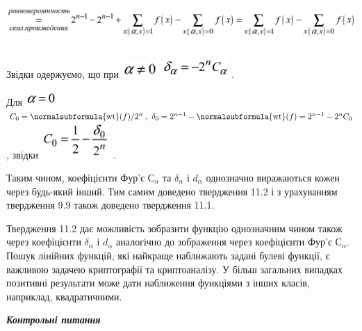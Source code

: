  \includegraphics[width=6.3in,height=0.5965in]{crypt-img/crypt-img287.png} 

\textcolor[rgb]{0.0,0.5019608,0.0}{Звідки}
\textcolor[rgb]{0.0,0.5019608,0.0}{одержуємо}, що при 
\includegraphics[width=0.5484in,height=0.261in]{crypt-img/crypt-img288.png} 
\includegraphics[width=0.9957in,height=0.339in]{crypt-img/crypt-img289.png} . 

Для 
\includegraphics[width=0.4646in,height=0.2256in]{crypt-img/crypt-img290.png}  
${C_{{0}}=\normalsubformula{\text{wt}}(f)/2^{{n}}\;,\ \delta
_{{0}}=2^{{n-1}}-\normalsubformula{\text{wt}}(f)=2^{{n-1}}-2^{{n}}C_{{0}}}$,
звідки 
\includegraphics[width=1.028in,height=0.5374in]{crypt-img/crypt-img291.png} .

Таким чином, коефіцієнти  Фур’є   ${\text{С}_{{\alpha }}}$ та  ${\delta
_{{\alpha }}}$  і   ${d_{{\alpha }}}$ однозначно виражаються кожен через
будь-який інший. Тим самим доведено твердження 11.2 і з урахуванням твердження
9.9\textit{  }також доведено твердження 11.1. 

Твердження 11.2 дає можливість зобразити функцію однозначним чином також через
коефіцієнти   ${\delta _{{\alpha }}}$  і   ${d_{{\alpha }}}$ аналогічно до
зображення через коефіцієнти  Фур’є   ${\text{С}_{{\alpha }}}$. Пошук лінійних
функцій, які найкраще наближають задані булеві функції, є важливою задачею
криптографії та криптоаналізу. У більш загальних випадках позитивні результати
може дати наближення функціями з інших класів, наприклад, квадратичними.


\bigskip


\bigskip

{\centering\bfseries\itshape
Контрольні питання
\par}


